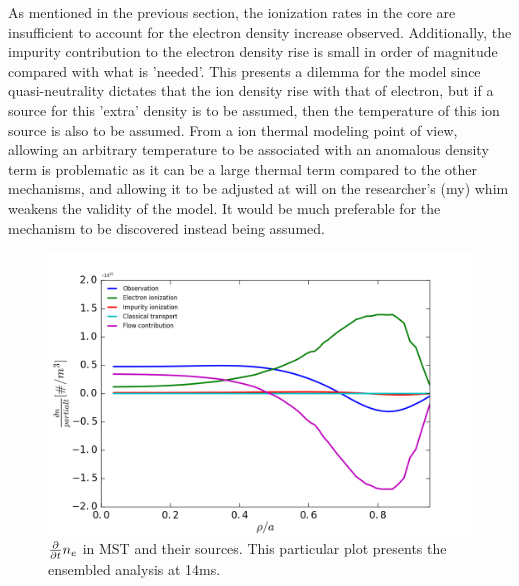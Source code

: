 As mentioned in the previous section, the ionization rates in the core are insufficient to account for the electron density increase observed. Additionally, the impurity contribution to the electron density rise is small in order of magnitude compared with what is 'needed'. This presents a dilemma for the model since quasi-neutrality dictates that the ion density rise with that of electron, but if a source for this 'extra' density is to be assumed, then the temperature of this ion source is also to be assumed. From a ion thermal modeling point of view, allowing an arbitrary temperature to be associated with an anomalous density term is problematic as it can be a large thermal term compared to the other mechanisms, and allowing it to be adjusted at will on the researcher's (my) whim weakens the validity of the model. It would be much preferable for the mechanism to be discovered instead being assumed. 

\begin{figure}
    \centering
    \includegraphics{ion_transport_results/density_balance.png}
    \caption{$\frac{\partial}{\partial t} n_e$ in MST and their sources. This particular plot presents the ensembled analysis at 14ms.}
    \label{fig:density_balance}
\end{figure}

